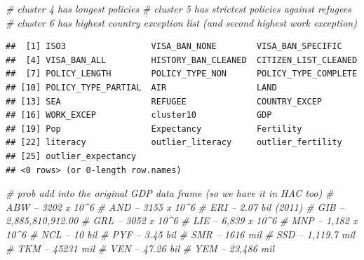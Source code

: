 \documentclass[]{article}
\newenvironment{Shaded}{\begin{snugshade}}{\end{snugshade}}
\newcommand{\CommentTok}[1]{\textcolor[rgb]{0.56,0.35,0.01}{\textit{#1}}}
\newcommand{\KeywordTok}[1]{\textcolor[rgb]{0.13,0.29,0.53}{\textbf{#1}}}
\newcommand{\NormalTok}[1]{#1}
\newcommand{\OperatorTok}[1]{\textcolor[rgb]{0.81,0.36,0.00}{\textbf{#1}}}
\begin{document}
\begin{Shaded}
\begin{Highlighting}[]
\CommentTok{# cluster 4 has longest policies}
\CommentTok{# cluster 5 has strictest policies against refugees}
\CommentTok{# cluster 6 has highest country exception list (and second highest work exception)}
\end{Highlighting}
\end{Shaded}

\begin{Shaded}
\end{Shaded}

\begin{verbatim}
##  [1] ISO3                 VISA_BAN_NONE        VISA_BAN_SPECIFIC   
##  [4] VISA_BAN_ALL         HISTORY_BAN_CLEANED  CITIZEN_LIST_CLEANED
##  [7] POLICY_LENGTH        POLICY_TYPE_NON      POLICY_TYPE_COMPLETE
## [10] POLICY_TYPE_PARTIAL  AIR                  LAND                
## [13] SEA                  REFUGEE              COUNTRY_EXCEP       
## [16] WORK_EXCEP           cluster10            GDP                 
## [19] Pop                  Expectancy           Fertility           
## [22] literacy             outlier_literacy     outlier_fertility   
## [25] outlier_expectancy  
## <0 rows> (or 0-length row.names)
\end{verbatim}

\begin{Shaded}
\begin{Highlighting}[]
\CommentTok{# prob add into the original GDP data frame (so we have it in HAC too)}
\CommentTok{# ABW -- 3202 x 10^6}
\CommentTok{# AND -- 3155 x 10^6}
\CommentTok{# ERI -- 2.07 bil (2011)}
\CommentTok{# GIB -- 2,885,810,912.00}
\CommentTok{# GRL -- 3052 x 10^6}
\CommentTok{# LIE -- 6,839 x 10^6}
\CommentTok{# MNP -- 1,182 x 10^6}
\CommentTok{# NCL -- 10 bil}
\CommentTok{# PYF -- 3.45 bil}
\CommentTok{# SMR -- 1616 mil}
\CommentTok{# SSD -- 1,119.7 mil}
\CommentTok{# TKM -- 45231 mil}
\CommentTok{# VEN -- 47.26 bil}
\CommentTok{# YEM -- 23,486 mil}
\end{Highlighting}
\end{Shaded}

\begin{Shaded}
\end{Shaded}
\end{document}
